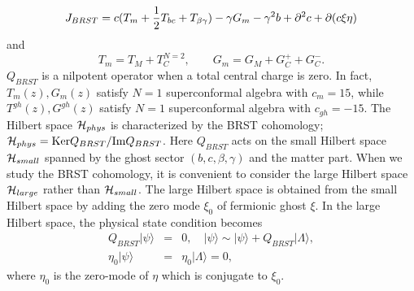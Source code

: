 \documentclass[a4paper,12pt]{article}
\begin{document}
\begin{equation}
J_{BRST}=
c(T_{m}+{1\over2}T_{bc}+T_{\beta\gamma})-\gamma G_{m}-\gamma^{2}b 
+\partial^2 c+\partial(c\xi\eta)
\label{eq:brs0}
\end{equation}
and
\begin{equation}
 T_{m}= T_{M}+T^{N=2}_{C},\quad\quad
 G_{m}= G_{M}+G^{+}_{C}+G^{-}_{C}.
\end{equation}
$Q_{BRST}$ is a nilpotent operator when a total central
charge is zero. In fact,
$T_{m}(z),G_{m}(z)$ satisfy 
$N=1$ superconformal algebra with $c_{m}=15$, while 
$T^{gh}(z),G^{gh}(z)$ satisfy $N=1$ superconformal algebra with $c_{gh}=-15$.
The Hilbert space ${\cal H}_{phys}$ is characterized by the BRST
cohomology;
${\cal H}_{phys}={\rm Ker}Q_{BRST}/{\rm Im}Q_{BRST}$.
Here $Q_{BRST}$ acts on the small Hilbert space
${\cal H}_{small}$ spanned by the ghost sector $(b,c,\beta,\gamma)$
and the matter part.
When we study the BRST cohomology, it is convenient to consider the
large Hilbert space ${\cal H}_{large}$ rather than ${\cal H}_{small}$.
The large Hilbert space is obtained from the 
small Hilbert space  by adding the zero mode $\xi_{0}$ of fermionic 
ghost $\xi$.
In the large Hilbert space, the physical state condition becomes
\begin{eqnarray}
 Q_{BRST}|\psi\rangle&=&0, \quad
|\psi\rangle\sim |\psi\rangle+Q_{BRST}|\Lambda\rangle,\nonumber\\
\eta_{0}|\psi\rangle&=&\eta_{0}|\Lambda\rangle=0,
\label{eq:phys1}
\end{eqnarray}
where 
$\eta_{0}$ is the zero-mode of $\eta$ which is conjugate to $\xi_{0}$.
\end{document}

